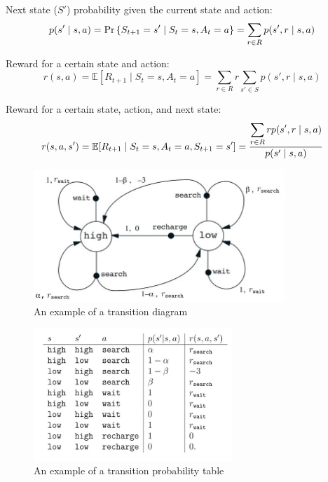 Next state ($S'$) probability given the current state and action:
\[
    p(s' \mid s, a) = \Pr\left\{S_{t+1} = s' \mid S_t = s, A_t = a\right\} = \sum_{r \in {R}} p(s', r \mid s, a)
\]

Reward for a certain state and action:
\[
    r(s, a) = \mathbb{E}[R_{t+1} \mid S_t = s, A_t = a] = \sum_{r \in {R}} r \sum_{s' \in {S}} p(s', r \mid s, a)
\]

Reward for a certain state, action, and next state:
\[
    r(s, a, s') = \mathbb{E}[R_{t+1} \mid S_t = s, A_t = a, S_{t+1} = s'] = \dfrac{\displaystyle\sum_{r \in {R}} r p(s', r \mid s, a)}{p(s' \mid s, a)}
\]

\begin{table}[H]
    \centering
    \begin{minipage}{0.35\linewidth}
        \begin{figure}[H]
            \includegraphics[height=5cm]{Pictures/deep-reinforcement-learning/eg1_mdp_fig.jpg}
            \caption{An example of a transition diagram}
        \end{figure}
    \end{minipage}
    \hfill
    \begin{minipage}{0.35\linewidth}
        \begin{figure}[H]
            \includegraphics[height=5cm]{Pictures/deep-reinforcement-learning/eg1_mdp_table.jpg}
            \caption{An example of a transition probability table}
        \end{figure}
    \end{minipage}
\end{table}

